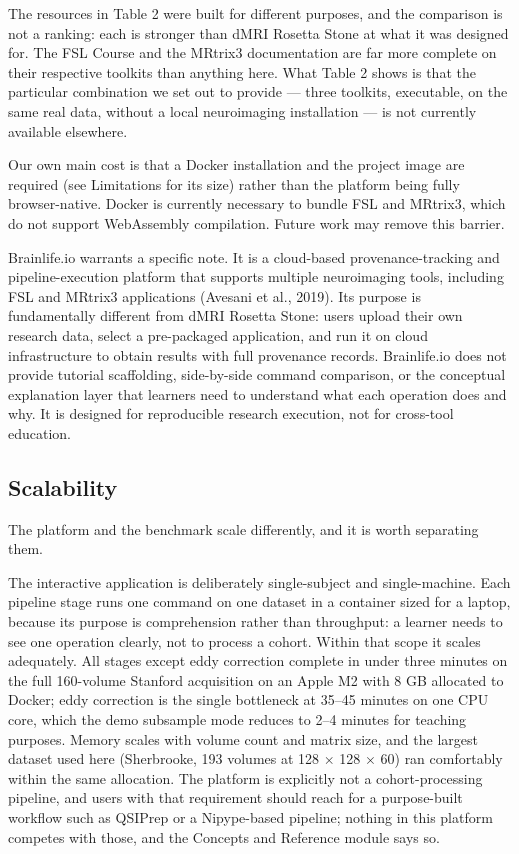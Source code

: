 \documentclass[12pt,a4paper]{article}
\begin{document}
The resources in Table 2 were built for different purposes, and the comparison is not a ranking: each is stronger than dMRI Rosetta Stone at what it was designed for. The FSL Course and the MRtrix3 documentation are far more complete on their respective toolkits than anything here. What Table 2 shows is that the particular combination we set out to provide --- three toolkits, executable, on the same real data, without a local neuroimaging installation --- is not currently available elsewhere.

Our own main cost is that a Docker installation and the project image are required (see Limitations for its size) rather than the platform being fully browser-native. Docker is currently necessary to bundle FSL and MRtrix3, which do not support WebAssembly compilation. Future work may remove this barrier.

Brainlife.io warrants a specific note. It is a cloud-based provenance-tracking and pipeline-execution platform that supports multiple neuroimaging tools, including FSL and MRtrix3 applications (Avesani et al., 2019). Its purpose is fundamentally different from dMRI Rosetta Stone: users upload their own research data, select a pre-packaged application, and run it on cloud infrastructure to obtain results with full provenance records. Brainlife.io does not provide tutorial scaffolding, side-by-side command comparison, or the conceptual explanation layer that learners need to understand what each operation does and why. It is designed for reproducible research execution, not for cross-tool education.

\subsection{Scalability}\label{scalability}

The platform and the benchmark scale differently, and it is worth separating them.

The interactive application is deliberately single-subject and single-machine. Each pipeline stage runs one command on one dataset in a container sized for a laptop, because its purpose is comprehension rather than throughput: a learner needs to see one operation clearly, not to process a cohort. Within that scope it scales adequately. All stages except eddy correction complete in under three minutes on the full 160-volume Stanford acquisition on an Apple M2 with 8 GB allocated to Docker; eddy correction is the single bottleneck at 35--45 minutes on one CPU core, which the demo subsample mode reduces to 2--4 minutes for teaching purposes. Memory scales with volume count and matrix size, and the largest dataset used here (Sherbrooke, 193 volumes at 128 $\times$ 128 $\times$ 60) ran comfortably within the same allocation. The platform is explicitly not a cohort-processing pipeline, and users with that requirement should reach for a purpose-built workflow such as QSIPrep or a Nipype-based pipeline; nothing in this platform competes with those, and the Concepts and Reference module says so.
\end{document}
